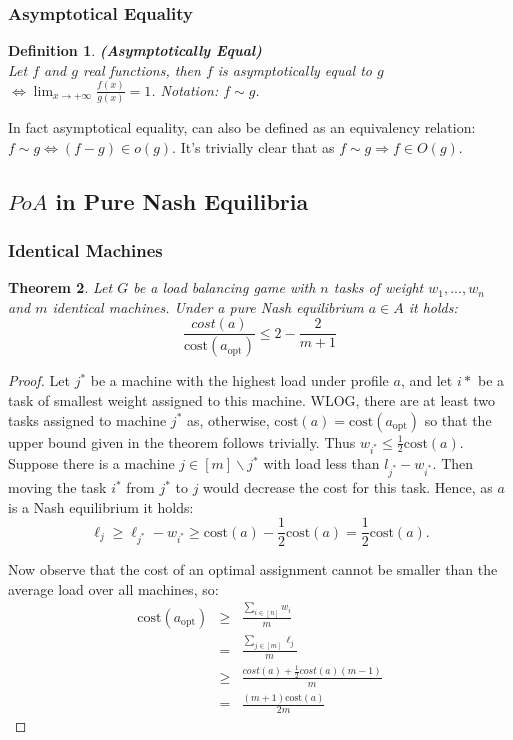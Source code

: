 \documentclass[a4paper,11pt]{article}
\newtheorem{theorem}{Theorem}[section]
\newtheorem{definition}[theorem]{Definition}
\newcommand{\cost}{\text{cost}}
\newcommand{\opt}{\text{opt}}
\newcommand{\copt}{\cost(a_{\opt})}
\begin{document}
\subsubsection{Asymptotical Equality}
\begin{definition}\textbf{(Asymptotically Equal)}\cite{12}\\
Let $f$ and $g$ real functions, then $f$ is asymptotically equal to $g$ $\Leftrightarrow \displaystyle\lim_{x\rightarrow +\infty} \frac{f(x)}{g(x)}=1$. Notation: $f \sim g$.
\end{definition}
In fact asymptotical equality, can also be defined as an equivalency relation: $f\sim g \Leftrightarrow (f-g) \in o(g)$. It's trivially clear that as $f\sim g \Rightarrow f \in O(g)$.



\subsection{$PoA$ in Pure Nash Equilibria}
\subsubsection{Identical Machines}
\begin{theorem}\label{puurid}Let $G$ be a load balancing game with $n$ tasks of weight $w_1,...,w_n$ and $m$ identical machines. Under a pure Nash equilibrium $a \in A$ it holds:
$$\frac{cost(a)}{\cost(a_{\opt})} \leq 2 - \frac{2}{m+1}$$
\end{theorem}
\begin{proof}
Let $j^*$ be a machine with the highest load under profile $a$, and let $i*$ be a task of smallest weight assigned to this machine. WLOG, there are at least two tasks assigned to machine $j^*$ as, otherwise, $\cost(a) = \cost(a_{\opt})$ so that the upper bound given in the theorem follows trivially. Thus $w_{i^*} \leq \frac{1}{2}\cost(a)$.\\

Suppose there is a machine $j \in [m]\backslash{j^*}$ with load less than $l_{j^*}-w_{i^*}$. Then moving  the task $i^*$ from $j^*$ to $j$ would decrease the cost for this task. Hence, as $a$ is a Nash equilibrium it holds:
$$\ell_j \geq \ell_{j^*}-w_{i^*} \geq \cost(a) - \frac{1}{2}\cost(a) = \frac{1}{2}\cost(a).$$

Now observe that the cost of an optimal assignment cannot be smaller than the average load over all machines, so:
\begin{eqnarray*}
\copt           &\geq& \frac{\sum_{i \in [n]}w_i}{m}  \\
                &=&  \frac{\sum_{j \in [m]}\ell_j}{m}\\
                &\geq& \frac{cost(a) + \frac{1}{2}cost(a)(m-1)}{m}\\
                &=& \frac{(m+1)\cost(a)}{2m}
\end{eqnarray*}
\end{proof}
\end{document}
